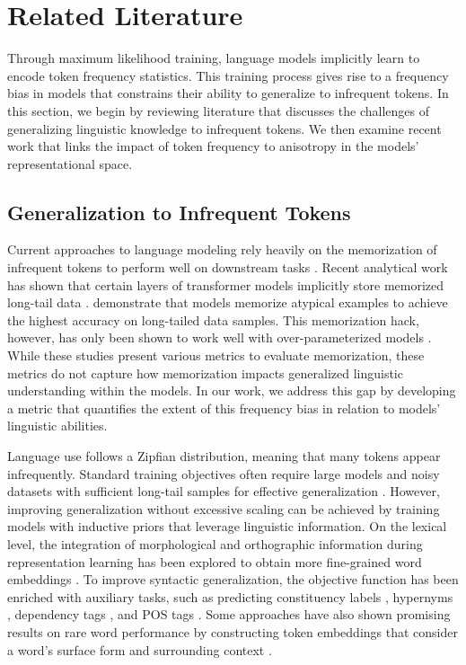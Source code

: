 \section{Related Literature}

Through maximum likelihood training, language models implicitly learn to encode token frequency statistics. This training process gives rise to a frequency bias in models that constrains their ability to generalize to infrequent tokens. In this section, we begin by reviewing literature that discusses the challenges of generalizing linguistic knowledge to infrequent tokens. We then examine recent work that links the impact of token frequency to anisotropy in the models' representational space.

\subsection{Generalization to Infrequent Tokens}

Current approaches to language modeling rely heavily on the memorization of infrequent tokens to perform well on downstream tasks \citep{feldman2020does}. Recent analytical work has shown that certain layers of transformer models implicitly store memorized long-tail data \citep{haviv2023understanding, kobayashi2023transformer}. \citet{feldman2020neural} demonstrate that models memorize atypical examples to achieve the highest accuracy on long-tailed data samples. This memorization hack, however, has only been shown to work well with over-parameterized models \citep{belkin2019reconciling}. While these studies present various metrics to evaluate memorization, these metrics do not capture how memorization impacts generalized linguistic understanding within the models. In our work, we address this gap by developing a metric that quantifies the extent of this frequency bias in relation to models' linguistic abilities.

Language use follows a Zipfian distribution, meaning that many tokens appear infrequently. Standard training objectives often require large models and noisy datasets with sufficient long-tail samples for effective generalization \citep{zheng2022memorization}. However, improving generalization without excessive scaling can be achieved by training models with inductive priors that leverage linguistic information. On the lexical level, the integration of morphological and orthographic information during representation learning has been explored to obtain more fine-grained word embeddings \citep{salle2018incorporating, vulic2017morphfitting, cotterel2015morphological, bhatia2016morphological, botha2014compositional}. To improve syntactic generalization, the objective function has been enriched with auxiliary tasks, such as predicting constituency labels \citep{wang2023language}, hypernyms \citep{bai2022better}, dependency tags \citep{cui2022lert}, and POS tags \citep{diehlmartinez2023climb}. Some approaches have also shown promising results on rare word performance by constructing token embeddings that consider a word's surface form and surrounding context \citep{schick2019attentive, schick2020rare}.

